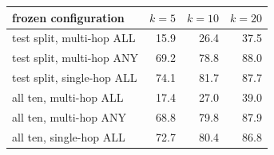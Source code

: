 \begin{tabular}{lrrr}
\toprule
frozen configuration & $k=5$ & $k=10$ & $k=20$ \\
\midrule
test split, multi-hop ALL & 15.9 & 26.4 & 37.5 \\
test split, multi-hop ANY & 69.2 & 78.8 & 88.0 \\
test split, single-hop ALL & 74.1 & 81.7 & 87.7 \\
all ten, multi-hop ALL & 17.4 & 27.0 & 39.0 \\
all ten, multi-hop ANY & 68.8 & 79.8 & 87.9 \\
all ten, single-hop ALL & 72.7 & 80.4 & 86.8 \\
\bottomrule
\end{tabular}
